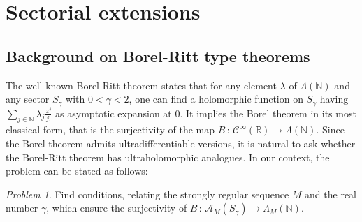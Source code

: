 \documentclass[a4paper]{amsart}
\theoremstyle{plain}
\theoremstyle{definition}
\theoremstyle{remark}
\newtheorem*{prob}{Problem}
\begin{document}
\section{Sectorial extensions}\label{ext}

\subsection{Background on Borel-Ritt type theorems}\label{extback}

The well-known Borel-Ritt theorem states that for any element $ \lambda $ of
$ \Lambda(\mathbb{N}) $ and any sector $ S_\gamma $ with $ 0<\gamma<2 $, one can find
a holomorphic function on $ S_\gamma $ having $ \sum_{j\in\mathbb{N}}\lambda_j\frac{z^j}{j!} $ as asymptotic expansion at $ 0 $. It
implies the Borel theorem in its most classical form, that is the surjectivity of the map $ B\, :\, \mathcal{C}^\infty(\mathbb{R})\longrightarrow\Lambda(\mathbb{N}) $. 
Since the Borel theorem admits ultradifferentiable versions,
it is natural to ask whether the Borel-Ritt theorem has ultraholomorphic analogues. 
In our context, the problem can be stated as follows:

\begin{prob}
Find conditions, relating the strongly regular sequence
$ M $ and the real number $ \gamma $, which ensure the surjectivity of $ B\, :\, \mathcal{A}_M(S_\gamma)\longrightarrow \Lambda_M(\mathbb{N}) $. 
\end{prob}
\end{document}
